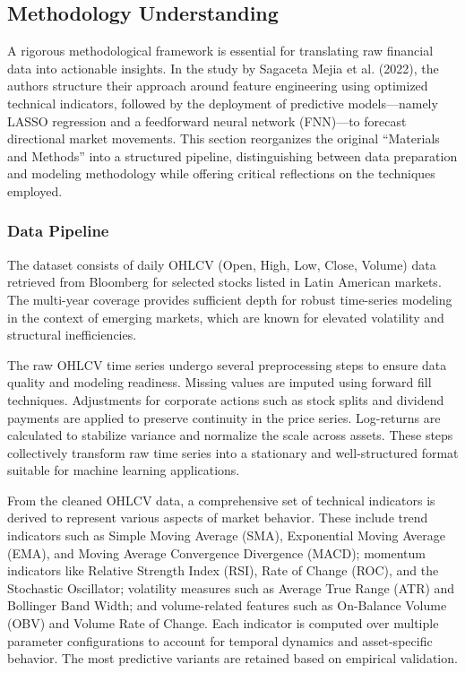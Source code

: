 \subsection{Methodology Understanding}

A rigorous methodological framework is essential for translating raw financial data into actionable insights. In the study by Sagaceta Mejia et al. (2022), the authors structure their approach around feature engineering using optimized technical indicators, followed by the deployment of predictive models—namely LASSO regression and a feedforward neural network (FNN)—to forecast directional market movements. This section reorganizes the original “Materials and Methods” into a structured pipeline, distinguishing between data preparation and modeling methodology while offering critical reflections on the techniques employed.

\subsubsection{Data Pipeline}

The dataset consists of daily OHLCV (Open, High, Low, Close, Volume) data retrieved from Bloomberg for selected stocks listed in Latin American markets. The multi-year coverage provides sufficient depth for robust time-series modeling in the context of emerging markets, which are known for elevated volatility and structural inefficiencies.

The raw OHLCV time series undergo several preprocessing steps to ensure data quality and modeling readiness. Missing values are imputed using forward fill techniques. Adjustments for corporate actions such as stock splits and dividend payments are applied to preserve continuity in the price series. Log-returns are calculated to stabilize variance and normalize the scale across assets. These steps collectively transform raw time series into a stationary and well-structured format suitable for machine learning applications.

From the cleaned OHLCV data, a comprehensive set of technical indicators is derived to represent various aspects of market behavior. These include trend indicators such as Simple Moving Average (SMA), Exponential Moving Average (EMA), and Moving Average Convergence Divergence (MACD); momentum indicators like Relative Strength Index (RSI), Rate of Change (ROC), and the Stochastic Oscillator; volatility measures such as Average True Range (ATR) and Bollinger Band Width; and volume-related features such as On-Balance Volume (OBV) and Volume Rate of Change. Each indicator is computed over multiple parameter configurations to account for temporal dynamics and asset-specific behavior. The most predictive variants are retained based on empirical validation.


